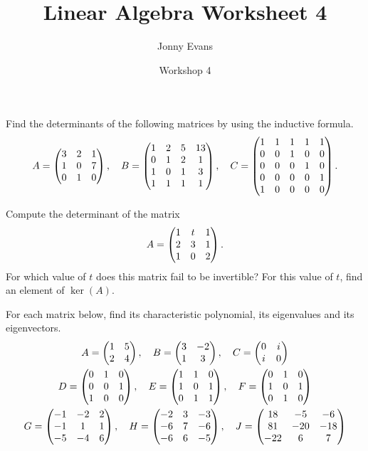 \documentclass{article}
\title{Linear Algebra Worksheet 4}
\author{Jonny Evans}
\date{Workshop 4}
\begin{document}
\maketitle
\setcounter{section}{4}


\begin{Exercise}\label{exr:routine1}
Find the determinants of the following matrices by using the
inductive formula. \[A=\begin{pmatrix} 3 & 2 & 1 \\ 1 & 0 & 7 \\ 0 & 1 &
0\end{pmatrix},\quad B=\begin{pmatrix} 1 & 2 & 5 & 13 \\ 0 & 1 & 2 & 1 \\ 1 & 0 & 1 & 3
\\ 1 & 1 & 1 & 1\end{pmatrix},\quad C=\begin{pmatrix} 1 & 1 & 1 & 1 & 1 \\ 0 & 0 & 1 & 0 &
0 \\ 0 & 0 & 0 & 1 & 0 \\ 0 & 0 & 0 & 0 & 1 \\ 1 & 0 & 0 & 0 &
0\end{pmatrix}.\]


\end{Exercise}
\begin{Exercise}\label{exr:routine3}
Compute the determinant of the matrix \[A=\begin{pmatrix} 1 & t & 1 \\ 2 & 3 & 1
\\ 1 & 0 & 2\end{pmatrix}.\] For which value of \(t\) does this matrix fail to
be invertible? For this value of \(t\), find an element of
\(\ker(A)\).




\end{Exercise}
\begin{Exercise}\label{exr:routineeval}
For each matrix below, find its characteristic polynomial, its
eigenvalues and its eigenvectors.
\begin{gather*}
A=\begin{pmatrix} 1 & 5 \\ 2 & 4 \end{pmatrix},\quad
B=\begin{pmatrix} 3 & -2 \\ 1 & 3 \end{pmatrix},\quad
C=\begin{pmatrix} 0 & i \\ i & 0 \end{pmatrix}\\
D=\begin{pmatrix} 0 & 1 & 0 \\ 0 & 0 & 1 \\ 1 & 0 & 0 \end{pmatrix},\quad
E=\begin{pmatrix} 1 & 1 & 0 \\ 1 & 0 & 1 \\ 0 & 1 & 1\end{pmatrix},\quad
F=\begin{pmatrix} 0 & 1 & 0 \\ 1 & 0 & 1 \\ 0 & 1 & 0\end{pmatrix}\\
G=\begin{pmatrix} -1 & -2 & 2 \\ -1 & 1 & 1 \\ -5 & -4 & 6\end{pmatrix},\quad
H=\begin{pmatrix} -2 & 3 & -3 \\ -6 & 7 & -6 \\ -6 & 6 & -5\end{pmatrix},\quad
J=\begin{pmatrix} 18 & -5 & -6 \\ 81 & -20 & -18 \\ -22 & 6 & 7\end{pmatrix}
\end{gather*}


\end{Exercise}
\end{document}
